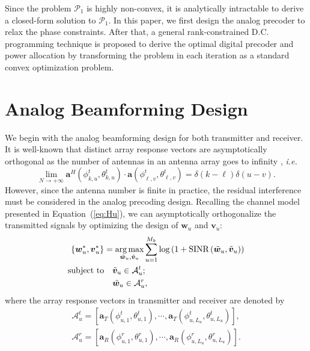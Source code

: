 \documentclass[10pt,journal,twocolumn,twoside]{IEEEtran}
\def\argmax{\mathop{\mbox{arg\,max}}}
\begin{document}
Since the problem $\mathcal{P}_1$ is highly non-convex, it is analytically intractable to derive a closed-form solution to $\mathcal{P}_1$. In this paper, we first design the analog precoder to relax the phase constraints. After that, a general rank-constrained D.C. programming technique is proposed to derive the optimal digital precoder and power allocation by transforming the problem in each iteration as a standard convex optimization problem.

\section{Analog Beamforming Design}\label{analog}

We begin with the analog beamforming design for both transmitter and receiver. It is well-known that distinct array response vectors are asymptotically orthogonal as the number of antennas in an antenna array goes to infinity \cite{sun2015beam}, {\em i.e.}
\begin{equation}\label{Eq:assumption}
\lim_{N\rightarrow +\infty} \bm{a}^{H}(\phi^t_{k,u},\theta^t_{k,u}) \cdot\bm{a}(\phi^t_{\ell,v},\theta^t_{\ell,v})=\delta(k-\ell)\delta(u-v).
\end{equation}
However, since the antenna number is finite in practice, the residual interference must be considered in the analog precoding design. Recalling the channel model presented in Equation~(\ref{eq:Hu}), we can asymptotically orthogonalize the transmitted signals by optimizing the design of $\bm{{w}}_{u}$ and $\bm{{v}}_{u}$:
\begin{align}\label{eq:group-scheduling}
\{\bm{{w}}^*_{u}, \bm{{v}}^*_{u}\} &=\underset{\tilde{\bm w }_{u}, \tilde{\bm v}_{u}}{\argmax}
\sum_{u=1}^{M_k}\log\left(1+ \text{SINR}\left(\tilde{\bm w}_{u}, \tilde{\bm v}_{u}\right)\right)  \\ \nonumber
\text{subject to}&\quad \tilde{\bm v}_{u}\in \mathcal{A}^t_{u};\\
&\quad \tilde{\bm w}_{u}\in \mathcal{A}^r_{u}, \nonumber
\end{align}
where the array response vectors in transmitter and receiver are denoted by
\begin{align}
\mathcal{A}^t_{u} = \left[\bm{a}_{T}(\phi^t_{{u,1}},\theta^t_{{u,1}}),\cdots,\bm{a}_{T}(\phi^t_{{u,L_{u}}},\theta^t_{{u,L_{u}}})\right],
\nonumber \\
\mathcal{A}^r_{u} = \left[\bm{a}_{R}(\phi^r_{{u,1}},\theta^r_{{u,1}}),\cdots,\bm{a}_{R}(\phi^r_{{u,L_{u}}},\theta^r_{{u,L_{u}}})\right].
\end{align}
\end{document}
